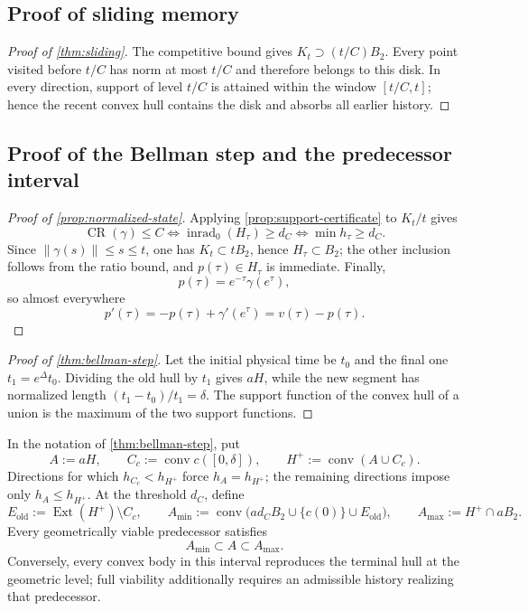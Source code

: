 \documentclass[10pt,a4paper]{article}
\theoremstyle{definition}
\theoremstyle{remark}
\DeclareMathOperator{\conv}{conv}
\DeclareMathOperator{\inrad}{inrad}
\DeclareMathOperator{\CR}{CR}
\DeclareMathOperator{\Ext}{Ext}
\newcommand{\norm}[1]{\lVert #1\rVert}
\begin{document}
\subsection{Proof of sliding memory}
\label{app:sliding-proof}
\begin{proof}[Proof of \cref{thm:sliding}]
The competitive bound gives $K_t\supset(t/C)B_2$. Every point visited before $t/C$ has norm at most $t/C$ and therefore belongs to this disk. In every direction, support of level $t/C$ is attained within the window $[t/C,t]$; hence the recent convex hull contains the disk and absorbs all earlier history.
\end{proof}

\subsection{Proof of the Bellman step and the predecessor interval}
\label{app:bellman-proof}
\begin{proof}[Proof of \cref{prop:normalized-state}]
Applying \cref{prop:support-certificate} to $K_t/t$ gives
\[
\CR(\gamma)\le C
\Longleftrightarrow
\inrad_0(H_\tau)\ge d_C
\Longleftrightarrow
\min h_\tau\ge d_C.
\]
Since $\norm{\gamma(s)}\le s\le t$, one has $K_t\subset tB_2$, hence $H_\tau\subset B_2$; the other inclusion follows from the ratio bound, and $p(\tau)\in H_\tau$ is immediate. Finally,
\[
p(\tau)=e^{-\tau}\gamma(e^\tau),
\]
so almost everywhere
\[
p'(\tau)=-p(\tau)+\gamma'(e^\tau)=v(\tau)-p(\tau).
\]
\end{proof}

\begin{proof}[Proof of \cref{thm:bellman-step}]
Let the initial physical time be $t_0$ and the final one $t_1=e^\Delta t_0$. Dividing the old hull by $t_1$ gives $aH$, while the new segment has normalized length $(t_1-t_0)/t_1=\delta$. The support function of the convex hull of a union is the maximum of the two support functions.
\end{proof}

In the notation of \cref{thm:bellman-step}, put
\[
A:=aH,
\qquad
C_c:=\conv c([0,\delta]),
\qquad
H^+:=\conv(A\cup C_c).
\]
Directions for which $h_{C_c}<h_{H^+}$ force $h_A=h_{H^+}$; the remaining directions impose only $h_A\le h_{H^+}$. At the threshold $d_C$, define
\[
E_{\mathrm{old}}:=\Ext(H^+)\setminus C_c,
\qquad
A_{\min}:=\conv\bigl(ad_CB_2\cup\{c(0)\}\cup E_{\mathrm{old}}\bigr),
\qquad
A_{\max}:=H^+\cap aB_2.
\]
Every geometrically viable predecessor satisfies
\[
A_{\min}\subset A\subset A_{\max}.
\]
Conversely, every convex body in this interval reproduces the terminal hull at the geometric level; full viability additionally requires an admissible history realizing that predecessor.
\end{document}
